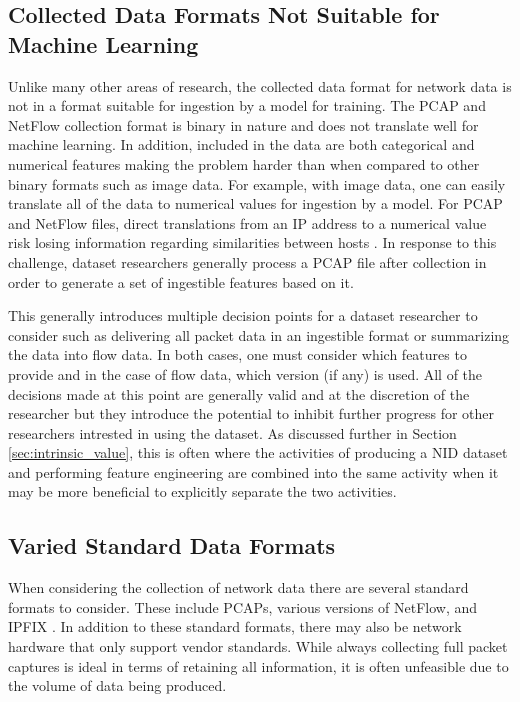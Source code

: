 \documentclass[conference]{IEEEtran}
\begin{document}
\subsection{Collected Data Formats Not Suitable for Machine Learning}\label{subsec:collectionformat}
Unlike many other areas of research, the collected data format for network data is not in a format suitable for ingestion by a model for training.
The PCAP and NetFlow collection format is binary in nature and does not translate well for machine learning.
In addition, included in the data are both categorical and numerical features making the problem harder than when compared to other binary formats such as image data. 
For example, with image data, one can easily translate all of the data to numerical values for ingestion by a model.
For PCAP and NetFlow files, direct translations from an IP address to a numerical value risk losing information regarding similarities between hosts \cite{ringip2vec}.
In response to this challenge, dataset researchers generally process a PCAP file after collection in order to generate a set of ingestible features based on it.

This generally introduces multiple decision points for a dataset researcher to consider such as delivering all packet data in an ingestible format or summarizing the data into flow data. 
In both cases, one must consider which features to provide and in the case of flow data, which version (if any) is used.
All of the decisions made at this point are generally valid and at the discretion of the researcher but they introduce the potential to inhibit further progress for other researchers intrested in using the dataset.
As discussed further in Section \ref{sec:intrinsic_value}, this is often where the activities of producing a NID dataset and performing feature engineering are combined into the same activity when it may be more beneficial to explicitly separate the two activities.

\subsection{Varied Standard Data Formats}\label{subsec:nostandard}
When considering the collection of network data there are several standard formats to consider.
These include PCAPs, various versions of NetFlow, and IPFIX \cite{claise2008specification}.
In addition to these standard formats, there may also be network hardware that only support vendor standards.
While always collecting full packet captures is ideal in terms of retaining all information, it is often unfeasible due to the volume of data being produced.
\end{document}
